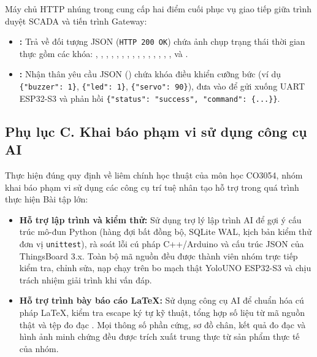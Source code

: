 Máy chủ HTTP nhúng  trong  cung cấp hai điểm cuối phục vụ giao tiếp giữa trình duyệt SCADA và tiến trình Gateway:
\begin{itemize}[leftmargin=*, itemsep=2pt]
  \item \textbf{:} Trả về đối tượng JSON (\texttt{HTTP 200 OK}) chứa ảnh chụp trạng thái thời gian thực gồm các khóa: , , , , , , , , , , , , , , ,  và .
  \item \textbf{:} Nhận thân yêu cầu JSON () chứa khóa điều khiển cưỡng bức (ví dụ \texttt{\{"buzzer": 1\}}, \texttt{\{"led": 1\}}, \texttt{\{"servo": 90\}}), đưa vào  để gửi xuống UART ESP32-S3 và phản hồi \texttt{\{"status": "success", "command": \{...\}\}}.
\end{itemize}

\subsection*{Phụ lục C. Khai báo phạm vi sử dụng công cụ AI}

Thực hiện đúng quy định về liêm chính học thuật của môn học CO3054, nhóm khai báo phạm vi sử dụng các công cụ trí tuệ nhân tạo hỗ trợ trong quá trình thực hiện Bài tập lớn:
\begin{itemize}[leftmargin=*, itemsep=2pt]
  \item \textbf{Hỗ trợ lập trình và kiểm thử:} Sử dụng trợ lý lập trình AI để gợi ý cấu trúc mô-đun Python (hàng đợi bất đồng bộ, SQLite WAL, kịch bản kiểm thử đơn vị \texttt{unittest}), rà soát lỗi cú pháp C++/Arduino và cấu trúc JSON của ThingsBoard 3.x. Toàn bộ mã nguồn đều được thành viên nhóm trực tiếp kiểm tra, chỉnh sửa, nạp chạy trên bo mạch thật YoloUNO ESP32-S3 và chịu trách nhiệm giải trình khi vấn đáp.
  \item \textbf{Hỗ trợ trình bày báo cáo LaTeX:} Sử dụng công cụ AI để chuẩn hóa cú pháp LaTeX, kiểm tra escape ký tự kỹ thuật, tổng hợp số liệu từ mã nguồn thật và tệp đo đạc . Mọi thông số phần cứng, sơ đồ chân, kết quả đo đạc và hình ảnh minh chứng đều được trích xuất trung thực từ sản phẩm thực tế của nhóm.
\end{itemize}

